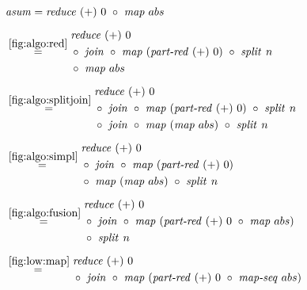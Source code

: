 \begin{figure*}[t]
\begin{align*}
  &\text{\textit{asum}} = \Reduce\ (+)\ 0\ \circ\ \Map\ abs\\[.5em]
  &\begin{aligned}
  & \overset{\ref{fig:algo:red}}{\hspace{.2em}=\hspace{.2em}}
      \begin{aligned}
        & \Reduce\ (+)\ 0\\
        &\circ\ \MyJoin\ \circ\ \Map\ (\PartRed\ (+)\ 0)\ \circ\ \MySplit\ n\\
        &\circ\ \Map\ abs
      \end{aligned}\\[.5em]
  & \overset{\ref{fig:algo:splitjoin}}{=\hspace{.2em}}
      \begin{aligned}
        & \Reduce\ (+)\ 0\\
        &\circ\ \MyJoin\ \circ\ \Map\ (\PartRed\ (+)\ 0)\ \circ\ \MySplit\ n\\
        &\circ\ \MyJoin\ \circ\ \Map\ (\Map\ abs)\ \circ\ \MySplit\ n
      \end{aligned}\\[.5em]
  & \overset{\ref{fig:algo:simpl}}{=\hspace{.2em}}
      \begin{aligned}
        & \Reduce\ (+)\ 0\\
        &\circ\ \MyJoin\ \circ\ \Map\ (\PartRed\ (+)\ 0)\\
        &\circ\ \Map\ (\Map\ abs)\ \circ\ \MySplit\ n
      \end{aligned}\\[.5em]
  & \overset{\ref{fig:algo:fusion}}{=\hspace{.2em}}
      \begin{aligned}
        & \Reduce\ (+)\ 0\\
        &\circ\ \MyJoin\ \circ\ \Map\ (\PartRed\ (+)\ 0\ \circ\ \Map\ abs)\\
        &\circ\ \MySplit\ n
      \end{aligned}\\[.5em]
  & \overset{\ref{fig:low:map}}{=\hspace{.2em}}
      \begin{aligned}
        & \Reduce\ (+)\ 0\\
        &\circ\ \MyJoin\ \circ\ \Map\ (\PartRed\ (+)\ 0\ \circ\ \MapSeq\ abs)\\

\end{aligned}
\end{aligned}
\end{align*}
\end{figure*}
